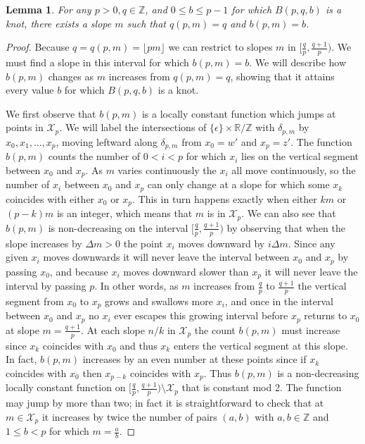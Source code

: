\documentclass{amsart}
\newcommand{\Z}{\mathbb{Z}}
\newtheorem{lem}[thm]{Lemma}
\theoremstyle{definition}
\theoremstyle{remark}
\numberwithin{equation}{section}
\numberwithin{equation}{section} \makeatletter
\begin{document}
\begin{lem}\label{lem:slope-for-every-b}
For any $p>0, q\in \Z$, and $0\le b\le p-1$ for which $B(p,q,b)$ is a knot, there exists a slope $m$ such that $q(p,m) = q$ and $b(p,m) = b$.
\end{lem}
\begin{proof}
Because $q = q(p,m) = \lfloor pm \rfloor$ we can restrict to slopes $m$ in $[\frac{q}{p}, \frac{q+1}{p})$. We must find a slope in this interval for which $b(p,m) = b$. We will describe how $b(p,m)$ changes as $m$ increases from $q(p,m) = q$, showing that it attains every value $b$ for which $B(p,q,b)$ is a knot.

We first observe that $b(p,m)$ is a locally constant function which jumps at points in $\mathcal{X}_p$. We will label the intersections of $\{\epsilon\}\times \mathbb{R}/\mathbb{Z}$ with $\delta_{p,m}$ by $x_0, x_1, \ldots, x_p$, moving leftward along $\delta_{p,m}$ from  $x_0 = w'$ and $x_p = z'$. The function $b(p,m)$ counts the number of $0 < i < p$ for which $x_i$ lies on the vertical segment between $x_0$ and $x_p$. As $m$ varies continuously the $x_i$ all move continuously, so the number of $x_i$ between $x_0$ and $x_p$ can only change at a slope for which some $x_k$ coincides with either $x_0$ or $x_p$. This in turn happens exactly when either $km$ or $(p-k)m$ is an integer, which means that $m$ is in $\mathcal{X}_p$. We can also see that $b(p,m)$ is non-decreasing on the interval $[\frac{q}{p}, \frac{q+1}{p})$ by observing that when the slope increases by $\Delta m>0$ the point $x_i$ moves downward by $i\Delta m$. Since any given $x_i$ moves downwards it will never leave the interval between $x_0$ and $x_p$ by passing $x_0$, and because $x_i$ moves downward slower than $x_p$ it will never leave the interval by passing $p$. In other words, as $m$ increases from $\frac{q}{p}$ to $\frac{q+1}{p}$ the vertical segment from $x_0$ to $x_p$ grows and swallows more $x_i$, and once in the interval between $x_0$ and $x_p$ no $x_i$ ever escapes this growing interval before $x_p$ returns to $x_0$ at slope $m = \frac{q+1}{p}$. At each slope $n/k$ in $\mathcal{X}_p$ the count $b(p,m)$ must increase since $x_k$ coincides with $x_0$ and thus $x_k$ enters the vertical segment at this slope. In fact, $b(p,m)$ increases by an even number at these points since if $x_k$ coincides with $x_0$ then $x_{p-k}$ coincides with $x_p$. Thus $b(p,m)$ is a non-decreasing locally constant function on $[\frac{q}{p}, \frac{q+1}{p})\setminus \mathcal{X}_p$ that is constant mod 2. The function may jump by more than two; in fact it is straightforward to check that at $m \in \mathcal{X}_p$ it increases by twice the number of pairs $(a,b)$ with $a,b \in \Z$ and $1 \le b < p$ for which $m = \frac{a}{b}$.


\end{proof}
\end{document}
